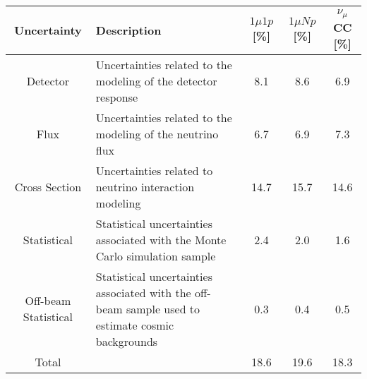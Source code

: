 \begin{tabular}{cp{8cm}ccc}
\toprule
Uncertainty & Description & $1\mu1p$ [\%] & $1\mu Np$ [\%] & $\nu_\mu$ CC [\%] \\
\midrule
Detector & Uncertainties related to the modeling of the detector response & 8.1 & 8.6 & 6.9 \\
Flux & Uncertainties related to the modeling of the neutrino flux & 6.7 & 6.9 & 7.3 \\
Cross Section & Uncertainties related to neutrino interaction modeling & 14.7 & 15.7 & 14.6 \\
Statistical & Statistical uncertainties associated with the Monte Carlo simulation sample & 2.4 & 2.0 & 1.6 \\
Off-beam Statistical & Statistical uncertainties associated with the off-beam sample used to estimate cosmic backgrounds & 0.3 & 0.4 & 0.5 \\
\midrule
Total &  & 18.6 & 19.6 & 18.3 \\
\bottomrule
\end{tabular}